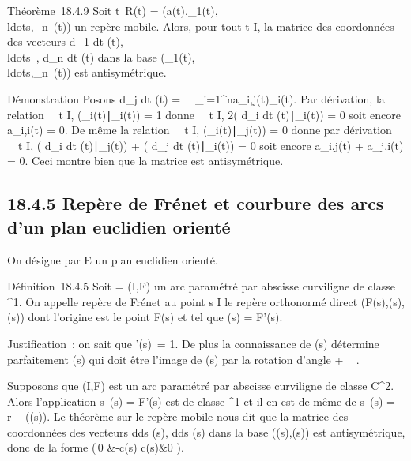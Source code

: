 \documentclass[]{article}
\begin{document}
Théorème~18.4.9 Soit t\mapsto~R(t) =
(a(t),\overrightarrowe_1(t),\\ldots,\overrightarrowe_n~(t))
un repère mobile. Alors, pour tout t \in I, la matrice des coordonnées des
vecteurs  d\overrightarrowe_1
\over dt
(t),\\ldots~,
d\overrightarrowe_n \over
dt (t) dans la base
(\overrightarrowe_1(t),\\ldots,\overrightarrowe_n~(t))
est antisymétrique.

Démonstration Posons  d\overrightarrowe_j
\over dt (t) =\
\sum ~
_i=1^na_i,j(t)\overrightarrowe_i(t).
Par dérivation, la relation \forall~~t \in I,
(\overrightarrowe_i(t)∣\overrightarrowe_i(t))
= 1 donne \forall~~t \in I, 2(
d\overrightarrowe_i \over
dt
(t)∣\overrightarrowe_i(t))
= 0 soit encore a_i,i(t) = 0. De même la relation
\forall~~t \in I,
(\overrightarrowe_i(t)∣\overrightarrowe_j(t))
= 0 donne par dérivation \forall~~t \in I, (
d\overrightarrowe_i \over
dt
(t)∣\overrightarrowe_j(t))
+ ( d\overrightarrowe_j
\over dt
(t)∣\overrightarrowe_i(t))
= 0 soit encore a_i,j(t) + a_j,i(t) = 0. Ceci montre
bien que la matrice est antisymétrique.

\subsection{18.4.5 Repère de Frénet et courbure des arcs d'un plan
euclidien orienté}

On désigne par E un plan euclidien orienté.

Définition~18.4.5 Soit \Gamma = (I,F) un arc paramétré par abscisse
curviligne de classe \mathcal{C}^1. On appelle repère de Frénet au
point s \in I le repère orthonormé direct
(F(s),\vect(s),\vecn(s)) dont
l'origine est le point F(s) et tel que \vect(s) =
F'(s).

Justification~: on sait que
\F'(s)\ = 1. De plus
la connaissance de \vect(s) détermine parfaitement
\vecn(s) qui doit être l'image de
\vect(s) par la rotation d'angle + \pi~
 .

Supposons que (I,F) est un arc paramétré par abscisse curviligne de
classe C^2. Alors l'application
s\mapsto~\vect(s) = F'(s) est de
classe ^1 et il en est de même de
s\mapsto~\vecn(s) =
r_\pi~(\vect(s)). Le théorème sur le repère
mobile nous dit que la matrice des coordonnées des vecteurs 
d\vect \over ds (s),
d\vecn \over ds (s) dans la base
(\vect(s),\vecn(s)) est
antisymétrique, donc de la forme \left
(\matrix\,0 &-c(s) \cr
c(s)&0 \right ).
\end{document}
